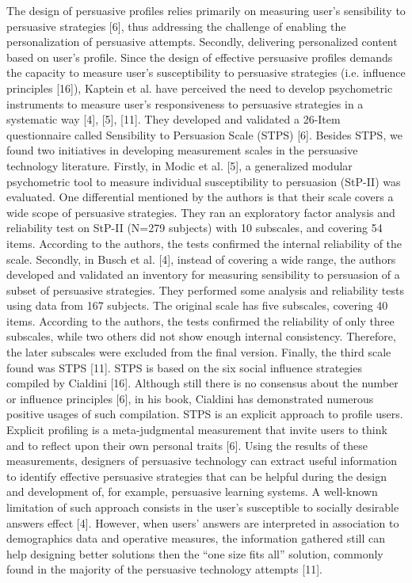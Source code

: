 The design of persuasive profiles relies primarily on measuring user’s sensibility to persuasive strategies [6], thus addressing the challenge of enabling the personalization of persuasive attempts. Secondly, delivering personalized content based on user’s profile. Since the design of effective persuasive profiles demands the capacity to measure user’s susceptibility to persuasive strategies (i.e. influence principles [16]), Kaptein et al. have perceived the need to develop psychometric instruments to measure user’s responsiveness to persuasive strategies in a systematic way [4], [5], [11]. They developed and validated a 26-Item questionnaire called Sensibility to Persuasion Scale (STPS) [6]. 
Besides STPS, we found two initiatives in developing measurement scales in the persuasive technology literature. Firstly, in Modic et al. [5], a generalized modular psychometric tool to measure individual susceptibility to persuasion (StP-II) was evaluated. One differential mentioned by the authors is that their scale covers a wide scope of persuasive strategies. They ran an exploratory factor analysis and reliability test on StP-II (N=279 subjects) with 10 subscales, and covering 54 items. According to the authors, the tests confirmed the internal reliability of the scale. Secondly, in Busch et al. [4], instead of covering a wide range, the authors developed and validated an inventory for measuring sensibility to persuasion of a subset of persuasive strategies. They performed some analysis and reliability tests using data from 167 subjects. The original scale has five subscales, covering 40 items. According to the authors, the tests confirmed the reliability of only three subscales, while two others did not show enough internal consistency. Therefore, the later subscales were excluded from the final version.
Finally, the third scale found was STPS [11]. STPS is based on the six social influence strategies compiled by Cialdini [16]. Although still there is no consensus about the number or influence principles [6], in his book, Cialdini has demonstrated numerous positive usages of such compilation. STPS is an explicit approach to profile users. Explicit profiling is a meta-judgmental measurement that invite users to think and to reflect upon their own personal traits [6]. Using the results of these measurements, designers of persuasive technology can extract useful information to identify effective persuasive strategies that can be helpful during the design and development of, for example, persuasive learning systems. A well-known limitation of such approach consists in the user’s susceptible to socially desirable answers effect [4]. However, when users’ answers are interpreted in association to demographics data and operative measures, the information gathered still can help designing better solutions then the “one size fits all” solution, commonly found in the majority of the persuasive technology attempts [11].

